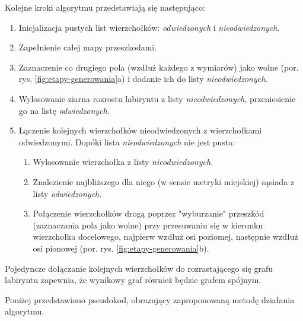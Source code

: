 Kolejne kroki algorytmu przedstawiają się następująco:
\begin{enumerate}
	\item Inicjalizacja pustych list wierzchołków: {\it odwiedzonych} i {\it nieodwiedzonych}.
	\item Zapełnienie całej mapy przeszkodami.
	\item Zaznaczenie co drugiego pola (wzdłuż każdego z wymiarów) jako wolne (por. rys. \ref{fig:etapy-generowania}a) i dodanie ich do listy {\it nieodwiedzonych}.
	\item Wylosowanie ziarna rozrostu labiryntu z listy {\it nieodwiedzonych}, przeniesienie go na listę {\it odwiedzonych}.
	\item Łączenie kolejnych wierzchołków nieodwiedzonych z wierzchołkami odwiedzonymi. Dopóki lista {\it nieodwiedzonych} nie jest pusta:
	\begin{enumerate}
		\item Wylosowanie wierzchołka z listy {\it nieodwiedzonych}.
		\item Znalezienie najbliższego dla niego (w sensie metryki miejskiej) sąsiada z listy {\it odwiedzonych}.
		\item Połączenie wierzchołków drogą poprzez "wyburzanie" przeszkód (zaznaczania pola jako wolne) przy przesuwaniu się w kierunku wierzchołka docelowego, najpierw wzdłuż osi poziomej, następnie wzdłuż osi pionowej (por. rys. \ref{fig:etapy-generowania}b).
	\end{enumerate}
\end{enumerate}

Pojedyncze dołączanie kolejnych wierzchołków do rozrastającego się grafu labiryntu zapewnia, że wynikowy graf również będzie grafem spójnym.

Poniżej przedstawiono pseudokod, obrazujący zaproponowaną metodę działania algorytmu.

